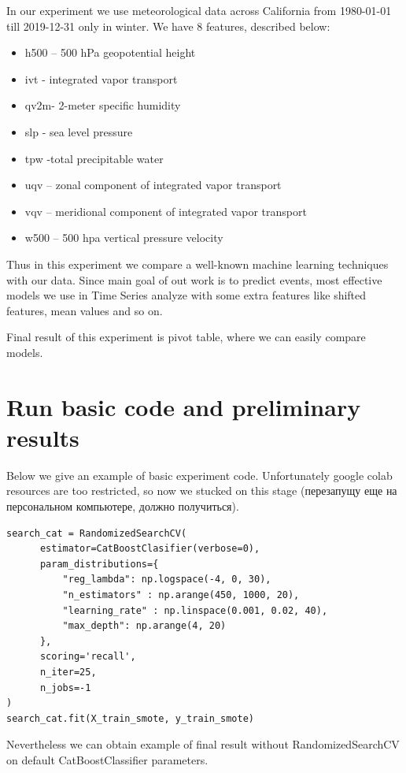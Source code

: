 \documentclass{article}
\begin{document}
In our experiment we use meteorological data across California from  1980-01-01 till 2019-12-31 only in winter. We have 8 features, described below:
\begin{itemize}
    \item h500 – 500 hPa geopotential height 
    \item ivt - integrated vapor transport 
    \item qv2m- 2-meter specific humidity
    \item slp - sea level pressure 
    \item tpw -total precipitable water
    \item uqv – zonal component of integrated vapor transport
    \item vqv – meridional component of integrated vapor transport
    \item w500 – 500 hpa vertical pressure velocity
\end{itemize}
Thus in this experiment we compare a well-known machine learning techniques with our data. Since main goal of out work is to predict events, most effective models we use in Time Series analyze with some extra features like shifted features, mean values and so on.

Final result of this experiment is pivot table, where we can easily compare models.



\section{Run basic code and preliminary results}
Below we give an example of basic experiment code. Unfortunately google colab resources are too restricted, so now we stucked on this stage (перезапущу еще на персональном компьютере, должно получиться). 

\begin{lstlisting}
search_cat = RandomizedSearchCV(
      estimator=CatBoostClasifier(verbose=0),
      param_distributions={
          "reg_lambda": np.logspace(-4, 0, 30),
          "n_estimators" : np.arange(450, 1000, 20),
          "learning_rate" : np.linspace(0.001, 0.02, 40),
          "max_depth": np.arange(4, 20)
      },
      scoring='recall',
      n_iter=25,
      n_jobs=-1
)
search_cat.fit(X_train_smote, y_train_smote)
\end{lstlisting}

Nevertheless we can obtain example of final result without RandomizedSearchCV on default CatBoostClassifier parameters.
\end{document}
